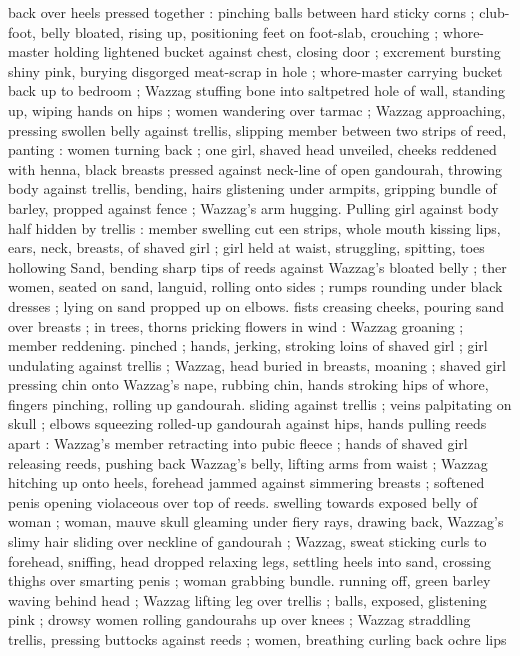 back over heels pressed together : pinching balls between hard
sticky corns ; club-foot, belly bloated, rising up, positioning feet on
foot-slab, crouching ; whore-master holding lightened bucket against
chest, closing door ; excrement bursting shiny pink, burying
disgorged meat-scrap in hole ; whore-master carrying bucket back
up to bedroom ; Wazzag stuffing bone into saltpetred hole of wall,
standing up, wiping hands on hips ; women wandering over tarmac ;
Wazzag approaching, pressing swollen belly against trellis, slipping
member between two strips of reed, panting : women turning back ;
one girl, shaved head unveiled, cheeks reddened with henna, black
breasts pressed against neck-line of open gandourah, throwing body
against trellis, bending, hairs glistening under armpits, gripping
bundle of barley, propped against fence ; Wazzag's arm hugging.
Pulling girl against body half hidden by trellis : member swelling cut
een strips, whole mouth kissing lips, ears, neck, breasts, of
shaved girl ; girl held at waist, struggling, spitting, toes hollowing
Sand, bending sharp tips of reeds against Wazzag’s bloated belly ;
ther women, seated on sand, languid, rolling onto sides ; rumps
rounding under black dresses ; lying on sand propped up on elbows.
fists creasing cheeks, pouring sand over breasts ; in trees, thorns
pricking flowers in wind : Wazzag groaning ; member reddening.
pinched ; hands, jerking, stroking loins of shaved girl ; girl
undulating against trellis ; Wazzag, head buried in breasts, moaning
; shaved girl pressing chin onto Wazzag's nape, rubbing chin, hands
stroking hips of whore, fingers pinching, rolling up gandourah.
sliding against trellis ; veins palpitating on skull ; elbows squeezing
rolled-up gandourah against hips, hands pulling reeds apart :
Wazzag's member retracting into pubic fleece ; hands of shaved girl
releasing reeds, pushing back Wazzag's belly, lifting arms from waist
; Wazzag hitching up onto heels, forehead jammed against simmering
breasts ; softened penis opening violaceous over top of reeds.
swelling towards exposed belly of woman ; woman, mauve skull
gleaming under fiery rays, drawing back, Wazzag's slimy hair sliding
over neckline of gandourah ; Wazzag, sweat sticking curls to
forehead, sniffing, head dropped relaxing legs, settling heels into
sand, crossing thighs over smarting penis ; woman grabbing bundle.
running off, green barley waving behind head ; Wazzag lifting leg
over trellis ; balls, exposed, glistening pink ; drowsy women rolling
gandourahs up over knees ; Wazzag straddling trellis, pressing
buttocks against reeds ; women, breathing curling back ochre lips
